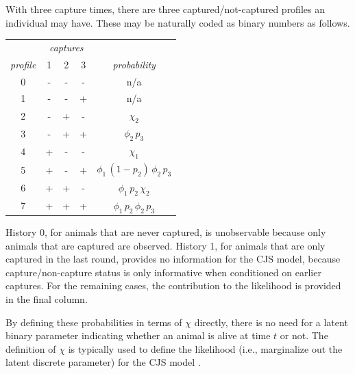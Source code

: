 With three capture times, there are three captured/not-captured
profiles an individual may have.  These may be naturally coded as
binary numbers as follows.
%
\begin{center}
\begin{tabular}{c|ccc|c}
& \multicolumn{3}{|c|}{{\it captures}}
\\
{\it profile} & 1 & 2 & 3 & {\it probability}
\\ \hline
{0} & - & - & - & n/a
\\
{1} & - & - & + & n/a
\\ \hline
{2} & - & + & - & $\chi_2$
\\
{3} & - & + & + & $\phi_2 \, p_3$
\\ \hline
{4} & + & - & - & $\chi_1$
\\
{5} & + & - & + & $\phi_1 \, (1 - p_2) \, \phi_2 \, p_3$
\\ \hline
{6} & + & + & - & $ \phi_1 \, p_2 \, \chi_2$
\\
{7} & + & + & + & $\phi_1 \, p_2 \, \phi_2 \, p_3$
\end{tabular}
\end{center}
%
History 0, for animals that are never captured, is unobservable
because only animals that are captured are observed. History 1, for
animals that are only captured in the last round, provides no
information for the CJS model, because capture/non-capture status is
only informative when conditioned on earlier captures.  For the
remaining cases, the contribution to the likelihood is provided in the
final column.

By defining these probabilities in terms of $\chi$ directly, there is
no need for a latent binary parameter indicating whether an animal is
alive at time $t$ or not.  The definition of $\chi$ is typically used
to define the likelihood (i.e., marginalize out the latent discrete
parameter) for the CJS model \citep[page 9]{Schofield:2007}.


